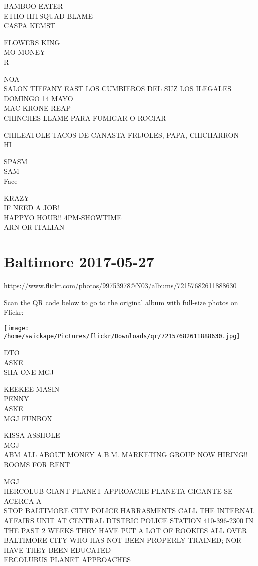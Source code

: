 \documentclass[10pt,letterpaper]{article}
\begin{document}
BAMBOO EATER\\
ETHO HITSQUAD BLAME\\
CASPA KEMST

FLOWERS KING\\
MO MONEY\\
R

NOA\\
SALON TIFFANY EAST LOS CUMBIEROS DEL SUZ LOS ILEGALES DOMINGO 14 MAYO\\
MAC KRONE REAP\\
CHINCHES LLAME PARA FUMIGAR O ROCIAR

CHILEATOLE TACOS DE CANASTA FRIJOLES, PAPA, CHICHARRON\\
HI

SPASM\\
SAM\\
Face

KRAZY\\
IF NEED A JOB!\\
HAPPYO HOUR!! 4PM{-}SHOWTIME\\
ARN OR ITALIAN


\section*{Baltimore 2017-05-27}

\url{https://www.flickr.com/photos/99753978@N03/albums/72157682611888630}

Scan the QR code below to go to the original album with full-size photos on Flickr:

\texttt{[image: /home/swickape/Pictures/flickr/Downloads/qr/72157682611888630.jpg]}


DTO\\
ASKE\\
SHA ONE MGJ

KEEKEE MASIN\\
PENNY\\
ASKE\\
MGJ FUNBOX

KISSA ASSHOLE\\
MGJ\\
ABM ALL ABOUT MONEY A.B.M. MARKETING GROUP NOW HIRING!!\\
ROOMS FOR RENT

MGJ\\
HERCOLUB GIANT PLANET APPROACHE PLANETA GIGANTE SE ACERCA A\\
STOP BALTIMORE CITY POLICE HARRASMENTS CALL THE INTERNAL AFFAIRS UNIT AT CENTRAL DTSTRIC POLICE STATION 410{-}396{-}2300 IN THE PAST 2 WEEKS THEY HAVE PUT A LOT OF ROOKIES ALL OVER BALTIMORE CITY WHO HAS NOT BEEN PROPERLY TRAINED; NOR HAVE THEY BEEN EDUCATED\\
ERCOLUBUS PLANET APPROACHES
\end{document}
